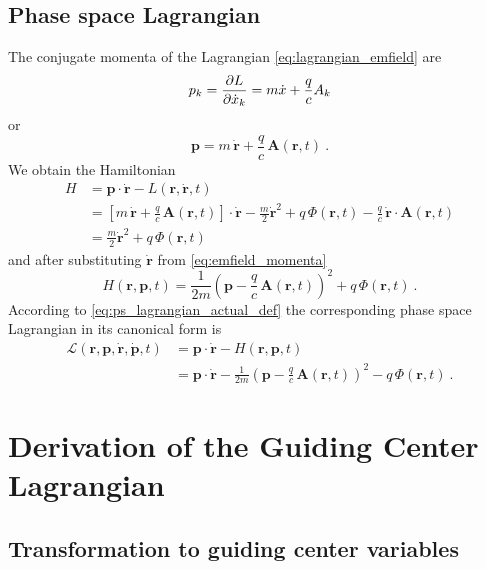 \documentclass{scrartcl}
\renewcommand{\vec}[1]{\boldsymbol{#1}}
\newcommand{\rv}{\vec{r}}
\newcommand{\rvdot}{\dot{\rv}}
\newcommand{\lag}{L}
\newcommand{\ham}{H}
\newcommand{\PSL}{\mathcal{L}}
\begin{document}
\subsection{Phase space Lagrangian}
The conjugate momenta of the Lagrangian \eqref{eq:lagrangian_emfield} are
\begin{equation*}
p_k = \pdv{\lag}{\dot{x}_k} = m\dot{x} + \frac{q}{c}A_k
\end{equation*}
or
\begin{equation}\label{eq:emfield_momenta}
\vec{p} = m\,\rvdot + \frac{q}{c}\,\vec{A}(\rv,t) \ .
\end{equation}
We obtain the Hamiltonian
\begin{align*}
\ham &= \vec{p}\cdot\rvdot - \lag(\rv,\rvdot,t) \\
&= \left[m\,\rvdot + \frac{q}{c}\,\vec{A}(\rv,t)\right]\cdot\rvdot - \frac{m}{2}\rvdot^2 + q\,\Phi(\rv,t) - \frac{q}{c}\,\rvdot\cdot\vec{A}(\rv,t) \\
&= \frac{m}{2}\rvdot^2 + q\,\Phi(\rv,t)
\end{align*}
and after substituting $\rvdot$ from \eqref{eq:emfield_momenta}
\begin{equation*}
\ham(\rv,\vec{p},t) = \frac{1}{2m}\left(\vec{p} - \frac{q}{c}\,\vec{A}(\rv,t)\right)^2 + q\,\Phi(\rv,t) \ .
\end{equation*}
According to \eqref{eq:ps_lagrangian_actual_def} the corresponding phase space Lagrangian in its canonical form is
\begin{align}
\PSL(\rv,\vec{p},\rvdot,\dot{\vec{p}},t) &= \vec{p}\cdot\rvdot - \ham(\rv,\vec{p},t) \nonumber\\
&= \vec{p}\cdot\rvdot - \frac{1}{2m}\left(\vec{p} - \frac{q}{c}\,\vec{A}(\rv,t)\right)^2 - q\,\Phi(\rv,t) \ .
\label{eq:emfield_psl}
\end{align}


\section{Derivation of the Guiding Center Lagrangian}

\subsection{Transformation to guiding center variables}
\end{document}
